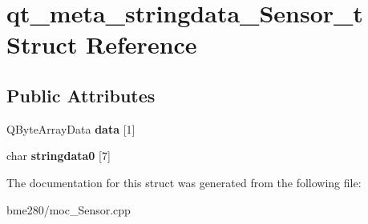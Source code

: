 \hypertarget{structqt__meta__stringdata__Sensor__t}{}\section{qt\+\_\+meta\+\_\+stringdata\+\_\+\+Sensor\+\_\+t Struct Reference}
\label{structqt__meta__stringdata__Sensor__t}
\subsection*{Public Attributes}
\begin{DoxyCompactItemize}
\item 
\mbox{\label{structqt__meta__stringdata__Sensor__t_a7a80030f98052e5bf2f3235631acddaf}} 
Q\+Byte\+Array\+Data {\bfseries data} \mbox{[}1\mbox{]}
\item 
\mbox{\label{structqt__meta__stringdata__Sensor__t_a398b74cf0a1759ac4a79cd62beaa3400}} 
char {\bfseries stringdata0} \mbox{[}7\mbox{]}
\end{DoxyCompactItemize}


The documentation for this struct was generated from the following file\+:\begin{DoxyCompactItemize}
\item 
bme280/moc\+\_\+\+Sensor.\+cpp\end{DoxyCompactItemize}
